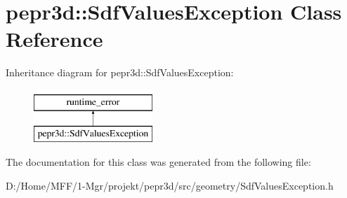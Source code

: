 \hypertarget{classpepr3d_1_1_sdf_values_exception}{}\section{pepr3d\+::Sdf\+Values\+Exception Class Reference}
\label{classpepr3d_1_1_sdf_values_exception}
Inheritance diagram for pepr3d\+::Sdf\+Values\+Exception\+:\begin{figure}[H]
\begin{center}
\leavevmode
\includegraphics[height=2.000000cm]{classpepr3d_1_1_sdf_values_exception}
\end{center}
\end{figure}


The documentation for this class was generated from the following file\+:\begin{DoxyCompactItemize}
\item 
D\+:/\+Home/\+M\+F\+F/1-\/\+Mgr/projekt/pepr3d/src/geometry/Sdf\+Values\+Exception.\+h\end{DoxyCompactItemize}
